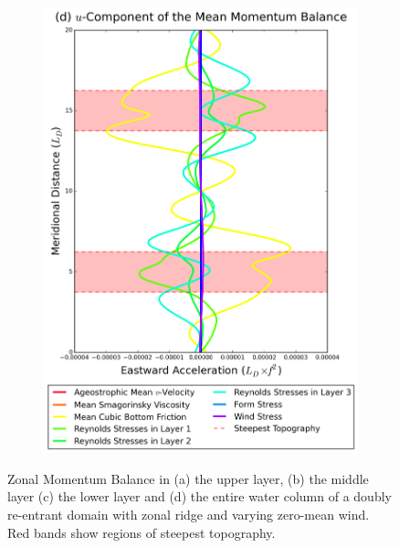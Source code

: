 \documentclass[12pt,a4paper]{report}
\begin{document}
\begin{figure}
\begin{subfigure}{0.46\linewidth}
 		\includegraphics[width=\linewidth ]{umom_4}
 		\label{fig:umomtotal}
 	\end{subfigure}
 	\caption{Zonal Momentum Balance in (a) the upper layer, (b) the middle layer
 		(c) the lower layer and (d) the entire water column of 
 		a doubly re-entrant domain with 
 		zonal ridge and varying zero-mean wind. Red bands show regions of steepest topography.}
 	\label{fig:umom}
 \end{figure}
 
\end{document}
